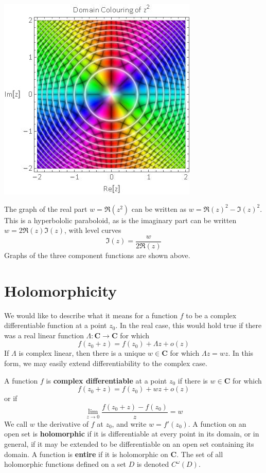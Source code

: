 \begin{example}
\begin{center}
    \includegraphics[scale = 0.5]{colorz2}
    \end{center}
    The graph of the real part $w = \Re(z^2)$ can be written as $w = \Re(z)^2 - \Im(z)^2$. This is a hyperbololic paraboloid, as is the imaginary part can be written $w = 2\Re(z)\Im(z)$, with level curves
    \[ \Im(z) = \frac{w}{2 \Re(z)} \]
    Graphs of the three component functions are shown above.
\end{example}

\section{Holomorphicity}
We would like to describe what it means for a function $f$ to be a complex differentiable function at a point $z_0$. In the real case, this would hold true if there was a real linear function $\Lambda: \mathbf{C} \to \mathbf{C}$ for which
%
\[ f(z_0 + z) = f(z_0) + \Lambda z + o(z) \]
%
If $\Lambda$ is complex linear, then there is a unique $w \in \mathbf{C}$ for which $\Lambda z = wz$. In this form, we may easily extend differentiability to the complex case.

\begin{definition}
    A function $f$ is {\bf complex differentiable} at a point $z_0$ if there is $w \in \mathbf{C}$ for which
    \[ f(z_0 + z) = f(z_0) + wz + o(z) \]
    or if
    \[ \lim_{z \to 0} \frac{f(z_0 + z) - f(z_0)}{z} = w \]
    We call $w$ the derivative of $f$ at $z_0$, and write $w = f'(z_0)$. A function on an open set is {\bf holomorphic} if it is differentiable at every point in its domain, or in general, if it may be extended to be differentiable on an open set containing its domain. A function is {\bf entire} if it is holomorphic on $\mathbf{C}$. The set of all holomorphic functions defined on a set $D$ is denoted $C^\omega(D)$.
\end{definition}

